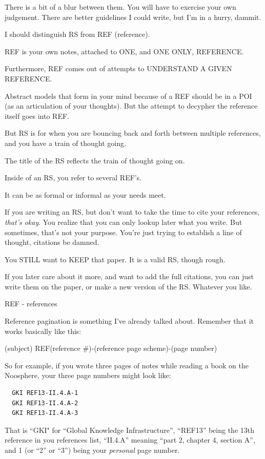 \documentclass[oneside]{book}
\begin{document}
There is a bit of a blur between them. You will have to exercise your
own judgement. There are better guidelines I could write, but I'm in a
hurry, dammit.

I should distinguish RS from REF (reference).

REF is your own notes, attached to ONE, and ONE ONLY, REFERENCE.

Furthermore, REF comes out of attempts to UNDERSTAND A GIVEN
REFERENCE.

Abstract models that form in your mind because of a REF should be in a
POI (as an articulation of your thoughts). But the attempt to decypher
the reference itself goes into REF.

But RS is for when you are bouncing back and forth between multiple
references, and you have a train of thought going.

The title of the RS reflects the train of thought going on.

Inside of an RS, you refer to several REF's.

It can be as formal or informal as your needs meet.

If you are writing an RS, but don't want to take the time to cite your
references, \emph{that's okay}. You realize that you can only lookup later
what you write. But sometimes, that's not your purpose. You're just
trying to establish a line of thought, citations be damned.

You STILL want to KEEP that paper. It is a valid RS, though rough.

If you later care about it more, and want to add the full citations,
you can just write them on the paper, or make a new version of the
RS. Whatever you like.

REF - references

Reference pagination is something I've already talked about. Remember
that it works basically like this:

  (subject) REF(reference \#)-(reference page scheme)-(page number)

  So for example, if you wrote three pages of notes while reading a
book on the Noosphere, your three page numbers might look like:

\begin{verbatim}
  GKI REF13-II.4.A-1
  GKI REF13-II.4.A-2
  GKI REF13-II.4.A-3
\end{verbatim}

  That is ``GKI" for ``Global Knowledge Infrastructure'', ``REF13'' being
the 13th reference in you references list, ``II.4.A'' meaning ``part 2,
chapter 4, section A'', and 1 (or ``2'' or ``3'') being your \emph{personal}
page number.
\end{document}
